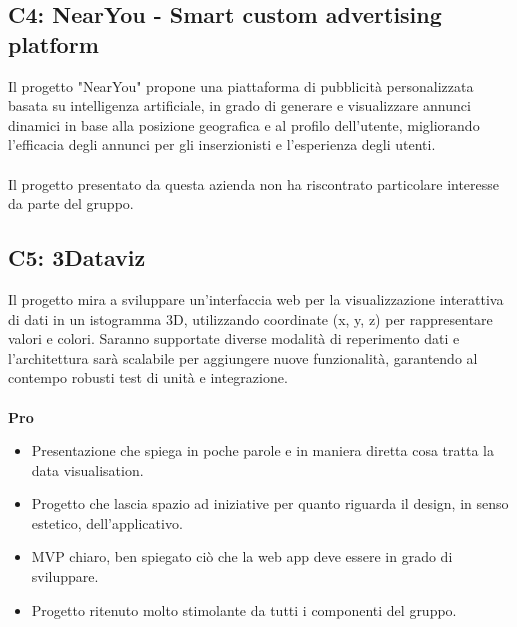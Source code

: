 \subsection{C4: NearYou - Smart custom advertising platform}
Il progetto "NearYou" propone una piattaforma di pubblicità personalizzata basata su intelligenza artificiale, in grado di generare e visualizzare annunci dinamici in base alla posizione geografica e al profilo dell'utente, migliorando l'efficacia degli annunci per gli inserzionisti e l'esperienza degli utenti.\\\\
Il progetto presentato da questa azienda non ha riscontrato particolare interesse da parte del gruppo. 

\subsection{C5: 3Dataviz}
Il progetto mira a sviluppare un'interfaccia web per la visualizzazione interattiva di dati in un istogramma 3D, utilizzando coordinate (x, y, z) per rappresentare valori e colori. Saranno supportate diverse modalità di reperimento dati e l'architettura sarà scalabile per aggiungere nuove funzionalità, garantendo al contempo robusti test di unità e integrazione.\\\\
\textbf{Pro}
\begin{itemize}
    \item Presentazione che spiega in poche parole e in maniera diretta cosa tratta la data visualisation.
    \item Progetto che lascia spazio ad iniziative per quanto riguarda il design, in senso estetico, dell'applicativo.
    \item MVP chiaro, ben spiegato ciò che la web app deve essere in grado di sviluppare.
    \item Progetto ritenuto molto stimolante da tutti i componenti del gruppo.
\end{itemize}



